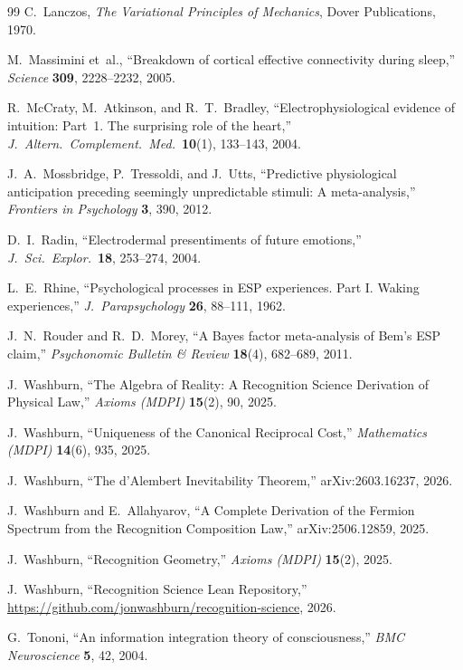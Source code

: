 \documentclass[11pt, a4paper]{article}
\theoremstyle{definition}
\theoremstyle{remark}
\begin{document}
\begin{thebibliography}{99}
C.~Lanczos,
\textit{The Variational Principles of Mechanics},
Dover Publications, 1970.

M.~Massimini et~al.,
``Breakdown of cortical effective connectivity during sleep,''
\textit{Science} \textbf{309}, 2228--2232, 2005.

R.~McCraty, M.~Atkinson, and R.~T.~Bradley,
``Electrophysiological evidence of intuition: Part~1. The
surprising role of the heart,''
\textit{J.\ Altern.\ Complement.\ Med.}\ \textbf{10}(1),
133--143, 2004.

J.~A.~Mossbridge, P.~Tressoldi, and J.~Utts,
``Predictive physiological anticipation preceding seemingly
unpredictable stimuli: A meta-analysis,''
\textit{Frontiers in Psychology} \textbf{3}, 390, 2012.

D.~I.~Radin,
``Electrodermal presentiments of future emotions,''
\textit{J.\ Sci.\ Explor.}\ \textbf{18}, 253--274, 2004.

L.~E.~Rhine,
``Psychological processes in ESP experiences. Part I. Waking
experiences,''
\textit{J.\ Parapsychology} \textbf{26}, 88--111, 1962.

J.~N.~Rouder and R.~D.~Morey,
``A Bayes factor meta-analysis of Bem's ESP claim,''
\textit{Psychonomic Bulletin \& Review} \textbf{18}(4),
682--689, 2011.

J.~Washburn,
``The Algebra of Reality: A Recognition Science Derivation of
Physical Law,''
\textit{Axioms (MDPI)} \textbf{15}(2), 90, 2025.

J.~Washburn,
``Uniqueness of the Canonical Reciprocal Cost,''
\textit{Mathematics (MDPI)} \textbf{14}(6), 935, 2025.

J.~Washburn,
``The d'Alembert Inevitability Theorem,''
arXiv:2603.16237, 2026.

J.~Washburn and E.~Allahyarov,
``A Complete Derivation of the Fermion Spectrum from the
Recognition Composition Law,''
arXiv:2506.12859, 2025.

J.~Washburn,
``Recognition Geometry,''
\textit{Axioms (MDPI)} \textbf{15}(2), 2025.

J.~Washburn,
``Recognition Science Lean Repository,''
\url{https://github.com/jonwashburn/recognition-science}, 2026.

G.~Tononi,
``An information integration theory of consciousness,''
\textit{BMC Neuroscience} \textbf{5}, 42, 2004.


\end{thebibliography}
\end{document}

